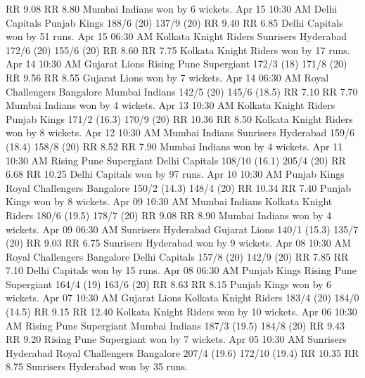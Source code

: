 RR 9.08
RR 8.80
Mumbai Indians won by 6 wickets.
Apr 15
10:30 AM
Delhi Capitals
Punjab Kings
188/6 (20)
137/9 (20)
RR 9.40
RR 6.85
Delhi Capitals won by 51 runs.
Apr 15
06:30 AM
Kolkata Knight Riders
Sunrisers Hyderabad
172/6 (20)
155/6 (20)
RR 8.60
RR 7.75
Kolkata Knight Riders won by 17 runs.
Apr 14
10:30 AM
Gujarat Lions
Rising Pune Supergiant
172/3 (18)
171/8 (20)
RR 9.56
RR 8.55
Gujarat Lions won by 7 wickets.
Apr 14
06:30 AM
Royal Challengers Bangalore
Mumbai Indians
142/5 (20)
145/6 (18.5)
RR 7.10
RR 7.70
Mumbai Indians won by 4 wickets.
Apr 13
10:30 AM
Kolkata Knight Riders
Punjab Kings
171/2 (16.3)
170/9 (20)
RR 10.36
RR 8.50
Kolkata Knight Riders won by 8 wickets.
Apr 12
10:30 AM
Mumbai Indians
Sunrisers Hyderabad
159/6 (18.4)
158/8 (20)
RR 8.52
RR 7.90
Mumbai Indians won by 4 wickets.
Apr 11
10:30 AM
Rising Pune Supergiant
Delhi Capitals
108/10 (16.1)
205/4 (20)
RR 6.68
RR 10.25
Delhi Capitals won by 97 runs.
Apr 10
10:30 AM
Punjab Kings
Royal Challengers Bangalore
150/2 (14.3)
148/4 (20)
RR 10.34
RR 7.40
Punjab Kings won by 8 wickets.
Apr 09
10:30 AM
Mumbai Indians
Kolkata Knight Riders
180/6 (19.5)
178/7 (20)
RR 9.08
RR 8.90
Mumbai Indians won by 4 wickets.
Apr 09
06:30 AM
Sunrisers Hyderabad
Gujarat Lions
140/1 (15.3)
135/7 (20)
RR 9.03
RR 6.75
Sunrisers Hyderabad won by 9 wickets.
Apr 08
10:30 AM
Royal Challengers Bangalore
Delhi Capitals
157/8 (20)
142/9 (20)
RR 7.85
RR 7.10
Delhi Capitals won by 15 runs.
Apr 08
06:30 AM
Punjab Kings
Rising Pune Supergiant
164/4 (19)
163/6 (20)
RR 8.63
RR 8.15
Punjab Kings won by 6 wickets.
Apr 07
10:30 AM
Gujarat Lions
Kolkata Knight Riders
183/4 (20)
184/0 (14.5)
RR 9.15
RR 12.40
Kolkata Knight Riders won by 10 wickets.
Apr 06
10:30 AM
Rising Pune Supergiant
Mumbai Indians
187/3 (19.5)
184/8 (20)
RR 9.43
RR 9.20
Rising Pune Supergiant won by 7 wickets.
Apr 05
10:30 AM
Sunrisers Hyderabad
Royal Challengers Bangalore
207/4 (19.6)
172/10 (19.4)
RR 10.35
RR 8.75
Sunrisers Hyderabad won by 35 runs.